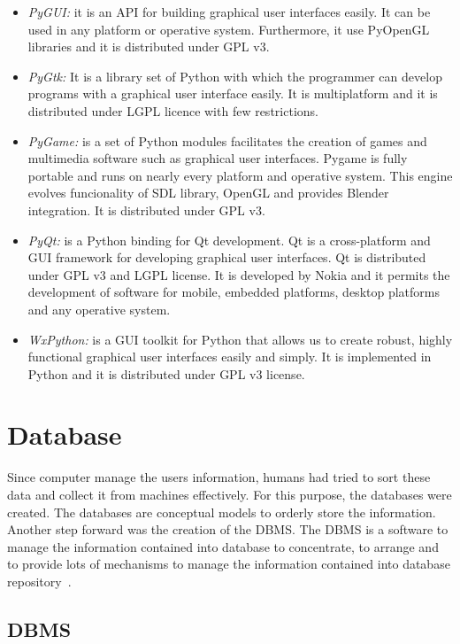 \begin{itemize}
\item \emph {PyGUI:} it is an \ac{API} for building graphical user interfaces
  easily. It can be used in any platform or
  operative system. Furthermore, it use  PyOpenGL libraries and it is distributed under \ac{GPL} v3.
\item \emph{PyGtk:} It is a library set of Python with which the programmer can
  develop  programs with a graphical user interface easily. It is multiplatform
  and it is distributed under \ac{LGPL} licence with few restrictions.
\item \emph{PyGame:} is a set of Python modules facilitates the creation of games and
  multimedia software such as graphical user interfaces. Pygame is fully portable and
  runs on nearly every platform and operative system. This engine evolves
  funcionality of \ac{SDL} library, OpenGL and provides Blender integration. It is
  distributed under \ac{GPL} v3.
\item \emph{PyQt:} is a Python binding for Qt development. Qt is a
  cross-platform  and \ac{GUI} framework for  developing graphical user interfaces. Qt
  is distributed under \ac{GPL} v3 and \ac{LGPL} license. It is developed by Nokia and it
  permits the development of software for mobile, embedded platforms, desktop platforms
  and any operative system.
\item \emph{WxPython:} is a \ac{GUI} toolkit for Python that allows us to create
  robust, highly functional graphical user interfaces easily and simply. It is
  implemented in Python and it is distributed under \ac{GPL} v3 license.
\end{itemize}


\section{Database}
Since computer manage the users information, humans had tried to sort these data
and collect it from machines effectively. For this purpose, the databases were
created. The databases are conceptual models to orderly store the information. Another step forward was the creation of the \ac{DBMS}. The \ac{DBMS}
is a software to manage the information contained into database to concentrate,
to arrange and to provide lots of mechanisms to manage the information contained
into database repository~\cite{Group2010}.

\subsection{DBMS}

